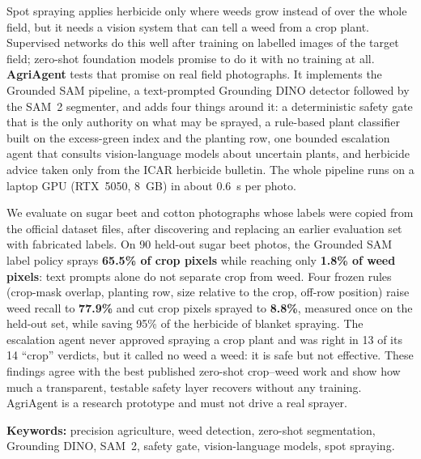Spot spraying applies herbicide only where weeds grow instead of over the whole field, but it needs a
vision system that can tell a weed from a crop plant. Supervised networks do this well after training
on labelled images of the target field; zero-shot foundation models promise to do it with no training
at all. \textbf{AgriAgent} tests that promise on real field photographs. It implements the Grounded SAM
pipeline, a text-prompted Grounding DINO detector
followed by the SAM~2 segmenter, and adds four things around it: a deterministic
safety gate that is the only authority on what may be sprayed, a rule-based plant classifier built on
the excess-green index and the planting row, one bounded escalation agent
that consults vision-language models about uncertain plants, and herbicide advice taken only from the
ICAR herbicide bulletin. The whole pipeline runs on a laptop GPU (RTX~5050,
8~GB) in about 0.6~s per photo.

We evaluate on sugar beet and cotton photographs whose labels were copied from the official dataset
files, after discovering and replacing an earlier evaluation set with fabricated labels. On 90
held-out sugar beet photos, the Grounded SAM label policy sprays \textbf{65.5\% of crop pixels} while
reaching only \textbf{1.8\% of weed pixels}: text prompts alone do not separate crop from weed. Four
frozen rules (crop-mask overlap, planting row, size relative to the crop, off-row position) raise weed
recall to \textbf{77.9\%} and cut crop pixels sprayed to \textbf{8.8\%}, measured once on the held-out set,
while saving 95\% of the herbicide of blanket spraying. The escalation agent never approved spraying a
crop plant and was right in 13 of its 14 ``crop'' verdicts, but it called no weed a weed: it is safe
but not effective. These findings agree with the best published zero-shot crop--weed
work and show how much a transparent, testable safety layer recovers without
any training. AgriAgent is a research prototype and must not drive a real sprayer.

\vspace{1em}
\noindent\textbf{Keywords:} precision agriculture, weed detection, zero-shot segmentation, Grounding DINO,
SAM~2, safety gate, vision-language models, spot spraying.
\clearpage
